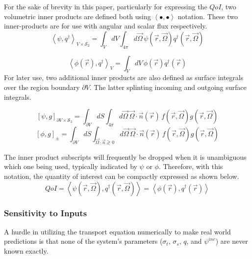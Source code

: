 \documentclass{article}
\newcommand{\vr}{\vec{r}}
\newcommand{\vO}{\vec{\Omega}}
\newcommand{\bra}{\left\langle}
\newcommand{\ket}{\right\rangle}
\newcommand{\sbra}{\left[}
\newcommand{\sket}{\right]}
\newcommand{\bound}{\partial V}
\newcommand{\vn}{\vec{n}}
\newcommand{\sigt}{\sigma_t}
\newcommand{\sigs}{\sigma_s}
\newcommand{\angResp}{q^\dag}
\newcommand{\scalResp}{q^\dag}
\newcommand{\qoi}{QoI}
\begin{document}
For the sake of brevity in this paper, particularly for expressing the $\qoi$, two volumetric inner products are defined both using $\bra \bullet , \bullet \ket$ notation. These two inner-products are for use with angular and scalar flux respectively. 
\begin{equation}
\bra \psi , \angResp \ket_{V \times \mathcal{S}_2}  = \int_V dV \int_{4 \pi} d \vO \,  \psi(\vr, \vO)\angResp(\vr, \vO)
\end{equation}

\begin{equation}
\bra \phi(\vr) ,\angResp \ket_V  = \int_V dV \,  \phi(\vr)\angResp(\vr)
\end{equation}
For later use, two additional inner products are also defined as surface integrals over the region boundary $\partial V$. The latter splinting incoming and outgoing surface integrals.

\begin{equation}
\sbra \psi , g \sket_{\bound \times \mathcal{S}_2}  = \int_{\bound} dS \int_{4 \pi} d \vO \, \vO \cdot \vn(\vr) \, f(\vr, \vO)g(\vr, \vO)
\end{equation}
\begin{equation}
\sbra \phi , g \sket_{\pm}   = \int_{\bound} dS \int_{\vO \cdot \vn \gtrless 0} d\vO \,  \vO \cdot \vn(\vr) \, f(\vr, \vO)g(\vr, \vO)
\end{equation}


The inner product subscripts will frequently be dropped when it is unambiguous which one being used, typically indicated by $\psi$ or $\phi$. Therefore, with this notation, the quantity of interest can be compactly expressed as shown below.
\begin{equation}
\label{QoIDef}
\qoi = \bra \psi(\vr,\vO), \angResp(\vr,\vO) \ket = \bra \phi(\vr) , \scalResp(\vr) \ket
\end{equation}

\subsubsection{Sensitivity to Inputs}
A hurdle in utilizing the transport equation numerically to make real world predictions is that none of the system's parameters ($\sigt$, $\sigs$, $q$, and $\psi^{inc}$) are never known exactly.


\end{document}
